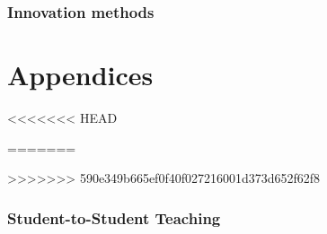 \section{Innovation methods}





\clearpage

\part{Appendices}
\appendix
{}%
\captionsetup{list=no}%
<<<<<<< HEAD

\newpage

% 
\newpage

\clearpage
=======



%

>>>>>>> 590e349b665ef0f40f027216001d373d652f62f8
\section{Student-to-Student Teaching}




% 
 